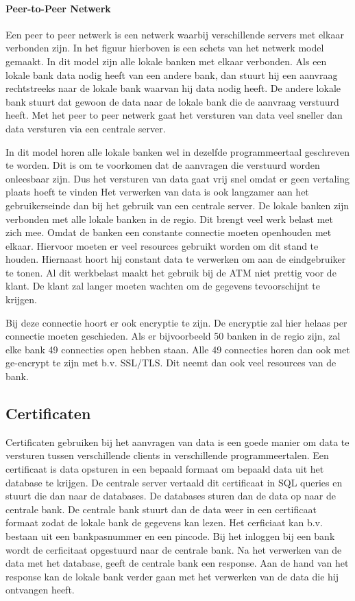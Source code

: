 \documentclass{article}
\begin{document}
\paragraph{Peer-to-Peer Netwerk}
Een peer to peer netwerk is een netwerk waarbij verschillende servers met
elkaar verbonden zijn.
In het figuur hierboven is een schets van het netwerk model gemaakt.
In dit model zijn alle lokale banken met elkaar verbonden.
Als een lokale bank data nodig heeft van een andere bank,
dan stuurt hij een aanvraag rechtstreeks naar de lokale bank
waarvan hij data nodig heeft.
De andere lokale bank stuurt dat gewoon de data naar de lokale bank
die de aanvraag verstuurd heeft.
Met het peer to peer netwerk gaat het versturen van data veel sneller
dan data versturen via een centrale server.

In dit model horen alle lokale banken wel in dezelfde programmeertaal geschreven te worden.
Dit is om te voorkomen dat de aanvragen die verstuurd worden onleesbaar zijn.
Dus het versturen van data gaat vrij snel omdat er geen vertaling plaats hoeft te vinden
Het verwerken van data is ook langzamer aan het gebruikerseinde dan bij
het gebruik van een centrale server.
De lokale banken zijn verbonden met alle lokale banken in de regio.
Dit brengt veel werk belast met zich mee.
Omdat de banken een constante connectie moeten openhouden met elkaar.
Hiervoor moeten er veel resources gebruikt worden om dit stand te houden.
Hiernaast hoort hij constant data te verwerken om aan de eindgebruiker te tonen.
Al dit werkbelast maakt het gebruik bij de ATM niet prettig voor de klant.
De klant zal langer moeten wachten om de gegevens tevoorschijnt te krijgen.

Bij deze connectie hoort er ook encryptie te zijn.
De encryptie zal hier helaas per connectie moeten geschieden.
Als er bijvoorbeeld 50 banken in de regio zijn,
zal elke bank 49 connecties open hebben staan.
Alle 49 connecties horen dan ook met ge-encrypt te zijn met b.v. SSL/TLS.
Dit neemt dan ook veel resources van de bank.

\subsection{Certificaten}
Certificaten gebruiken bij het aanvragen van data is een goede manier
om data te versturen tussen verschillende clients in verschillende programmeertalen.
Een certificaat is data opsturen in een bepaald formaat om bepaald data uit het
database te krijgen.
De centrale server vertaald dit certificaat in SQL queries en stuurt die dan naar
de databases.
De databases sturen dan de data op naar de centrale bank.
De centrale bank stuurt dan de data weer in een certificaat formaat
zodat de lokale bank de gegevens kan lezen.
Het cerficiaat kan b.v. bestaan uit een bankpasnummer en een pincode.
Bij het inloggen bij een bank wordt de cerficitaat opgestuurd naar de centrale bank.
Na het verwerken van de data met het database,
geeft de centrale bank een response.
Aan de hand van het response kan de lokale bank verder gaan met het
verwerken van de data die hij ontvangen heeft.
\end{document}
